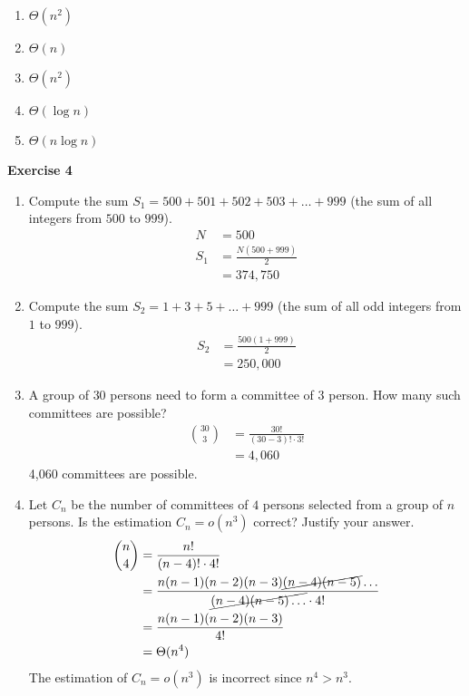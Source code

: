 \documentclass[11pt]{article}
\begin{document}
\vspace{2cm}
\begin{enumerate}[label=(\alph*), leftmargin=*]
  \item \(\Theta{(n^2)}\)
  \item \(\Theta{(n)}\)
  \item \(\Theta{(n^2)}\)
  \item \(\Theta{(\log n)}\)
  \item \(\Theta{(n\log n)}\)
\end{enumerate}
\newpage
{\parindent0pt\textbf{Exercise 4}}
\begin{enumerate}[label=(\alph*)]
  \item Compute the sum \(S_1 = 500 + 501 + 502 + 503 + \ldots + 999\) (the sum of all integers from $500$ to $999$).
        \begin{align*}
          N   & = 500                                 \\
          S_1 & = \displaystyle\frac{N(500 + 999)}{2} \\
              & = 374,750
        \end{align*}
  \item Compute the sum \(S_2 = 1 + 3 + 5 + \ldots + 999\) (the sum of all odd integers from $1$ to $999$).
        \begin{align*}
          S_2 & = \displaystyle\frac{500(1 + 999)}{2} \\
              & = 250,000
        \end{align*}
  \item A group of $30$ persons need to form a committee of $3$ person. How many such committees are possible?
        \begin{align*}
          \binom{30}{3} & = \displaystyle\frac{30!}{(30-3)!\cdot 3!} \\
                        & = 4,060
        \end{align*}
        4,060 committees are possible.
  \item Let $C_n$ be the number of committees of $4$ persons selected from a group of $n$ persons. Is the estimation \(C_n=o(n^3)\) correct? Justify your answer.
        \begin{align*}
          \binom{n}{4} & = \displaystyle \frac{n!}{(n-4)! \cdot 4!}                                                             \\
                       & = \displaystyle \frac{n(n-1)(n-2)(n-3)\cancel{(n-4)(n-5)} \ldots}{\cancel{(n-4)(n-5) \ldots} \cdot 4!} \\
                       & = \displaystyle \frac{n(n-1)(n-2)(n-3)}{4!}                                                            \\
                       & = \Theta{(n^{4})}
        \end{align*}
        The estimation of \(C_{n} = o(n^{3})\) is incorrect since \(n^4 > n^3\).
\end{enumerate}
\end{document}
